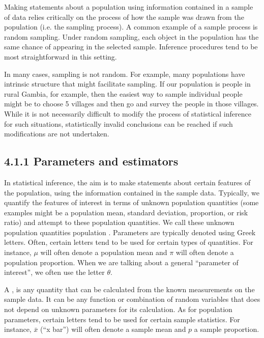 \documentclass[letterpaper,10pt,english]{jupyterBook}
\begin{document}
\sphinxAtStartPar
Making statements about a population using information contained in a sample of data relies critically on the process of how the sample was drawn from the population (i.e. the sampling process). A common example of a sample process is random sampling. Under random sampling, each object in the population has the same chance of appearing in the selected sample. Inference procedures tend to be most straightforward in this setting.

\sphinxAtStartPar
In many cases, sampling is not random. For example, many populations have intrinsic structure that might facilitate sampling. If our population is people in rural Gambia, for example, then the easiest way to sample individual people might be to choose 5 villages and then go and survey the people in those villages. While it is not necessarily difficult to modify the process of statistical inference for such situations, statistically invalid conclusions can be reached if such modifications are not undertaken.


\subsection{4.1.1 Parameters and estimators}
\label{\detokenize{04.b. Population.and.samples:parameters-and-estimators}}
\sphinxAtStartPar
In statistical inference, the aim is to make statements about certain features of the population, using the information contained in the sample data. Typically, we quantify the features of interest in terms of unknown population quantities (some examples might be a population mean, standard deviation, proportion, or risk ratio) and attempt to  these population quantities. We call these unknown population quantities population . Parameters are typically denoted using Greek letters. Often, certain letters tend to be used for certain types of quantities. For instance, \(\mu\) will often denote a population mean and \(\pi\) will often denote a population proportion. When we are talking about a general “parameter of interest”, we often use the letter \(\theta\).

\sphinxAtStartPar
A , is any quantity that can be calculated from the known measurements on the sample data. It can be any function or combination of random variables that does not depend on unknown parameters for its calculation. As for population parameters, certain letters tend to be used for certain sample statistics. For instance, \(\bar{x}\) (“x bar”) will often denote a sample mean and \(p\) a sample proportion.
\end{document}
